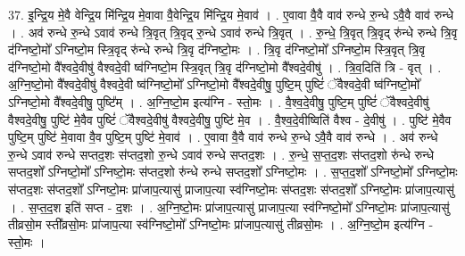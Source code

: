 \documentclass[17pt]{extarticle}
\begin{document}
37. इ॒न्द्रि॒य मे॒वै वेन्द्रि॒य मि॑न्द्रि॒य मे॒वावा वै॒वेन्द्रि॒य मि॑न्द्रि॒य मे॒वाव॑ । . ए॒वावा वै॒वै वाव॑ रुन्धे रु॒न्धे ऽवै॒वै वाव॑ रुन्धे । . अव॑ रुन्धे रु॒न्धे ऽवाव॑ रुन्धे त्रि॒वृत् त्रि॒वृद् रु॒न्धे ऽवाव॑ रुन्धे त्रि॒वृत् । . रु॒न्धे॒ त्रि॒वृत् त्रि॒वृद् रु॑न्धे रुन्धे त्रि॒वृ द॑ग्निष्टो॒मो᳚ ऽग्निष्टो॒म स्त्रि॒वृद् रु॑न्धे रुन्धे त्रि॒वृ द॑ग्निष्टो॒मः । . त्रि॒वृ द॑ग्निष्टो॒मो᳚ ऽग्निष्टो॒म स्त्रि॒वृत् त्रि॒वृ द॑ग्निष्टो॒मो वै᳚श्वदे॒वीषु॑ वैश्वदे॒वी ष्व॑ग्निष्टो॒म स्त्रि॒वृत् त्रि॒वृ द॑ग्निष्टो॒मो वै᳚श्वदे॒वीषु॑ । . त्रि॒व॒दिति॑ त्रि - वृत् । . अ॒ग्नि॒ष्टो॒मो वै᳚श्वदे॒वीषु॑ वैश्वदे॒वी ष्व॑ग्निष्टो॒मो᳚ ऽग्निष्टो॒मो वै᳚श्वदे॒वीषु॒ पुष्टि॒म् पुष्टिं॑ ॅवैश्वदे॒वी ष्व॑ग्निष्टो॒मो᳚ ऽग्निष्टो॒मो वै᳚श्वदे॒वीषु॒ पुष्टि᳚म् । . अ॒ग्नि॒ष्टो॒म इत्य॑ग्नि - स्तो॒मः । . वै॒श्व॒दे॒वीषु॒ पुष्टि॒म् पुष्टिं॑ ॅवैश्वदे॒वीषु॑ वैश्वदे॒वीषु॒ पुष्टि॑ मे॒वैव पुष्टिं॑ ॅवैश्वदे॒वीषु॑ वैश्वदे॒वीषु॒ पुष्टि॑ मे॒व । . वै॒श्व॒दे॒वीष्विति॑ वैश्व - दे॒वीषु॑ । . पुष्टि॑ मे॒वैव पुष्टि॒म् पुष्टि॑ मे॒वावा वै॒व पुष्टि॒म् पुष्टि॑ मे॒वाव॑ । . ए॒वावा वै॒वै वाव॑ रुन्धे रु॒न्धे ऽवै॒वै वाव॑ रुन्धे । . अव॑ रुन्धे रु॒न्धे ऽवाव॑ रुन्धे सप्तद॒शः स॑प्तद॒शो रु॒न्धे ऽवाव॑ रुन्धे सप्तद॒शः । . रु॒न्धे॒ स॒प्त॒द॒शः स॑प्तद॒शो रु॑न्धे रुन्धे सप्तद॒शो᳚ ऽग्निष्टो॒मो᳚ ऽग्निष्टो॒मः स॑प्तद॒शो रु॑न्धे रुन्धे सप्तद॒शो᳚ ऽग्निष्टो॒मः । . स॒प्त॒द॒शो᳚ ऽग्निष्टो॒मो᳚ ऽग्निष्टो॒मः स॑प्तद॒शः स॑प्तद॒शो᳚ ऽग्निष्टो॒मः प्रा॑जाप॒त्यासु॑ प्राजाप॒त्या स्व॑ग्निष्टो॒मः स॑प्तद॒शः स॑प्तद॒शो᳚ ऽग्निष्टो॒मः प्रा॑जाप॒त्यासु॑ । . स॒प्त॒द॒श इति॑ सप्त - द॒शः । . अ॒ग्नि॒ष्टो॒मः प्रा॑जाप॒त्यासु॑ प्राजाप॒त्या स्व॑ग्निष्टो॒मो᳚ ऽग्निष्टो॒मः प्रा॑जाप॒त्यासु॑ तीव्रसो॒म स्ती᳚व्रसो॒मः प्रा॑जाप॒त्या स्व॑ग्निष्टो॒मो᳚ ऽग्निष्टो॒मः प्रा॑जाप॒त्यासु॑ तीव्रसो॒मः । . अ॒ग्नि॒ष्टो॒म इत्य॑ग्नि - स्तो॒मः । \newline
\end{document}
